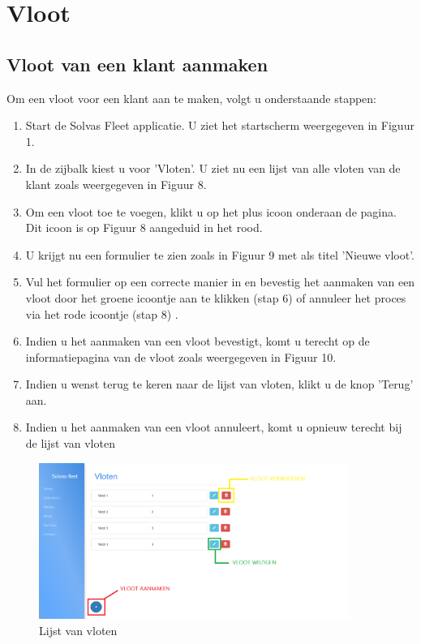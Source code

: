 \documentclass[11pt,openany]{article}
\begin{document}
\section{Vloot}
\subsection{Vloot van een klant aanmaken}
Om een vloot voor een klant aan te maken, volgt u onderstaande stappen:
\begin{enumerate}
	\item Start de Solvas Fleet applicatie. U ziet het startscherm weergegeven in Figuur 1.
	\item In de zijbalk kiest u voor 'Vloten'. U ziet nu een lijst van alle vloten van de klant zoals weergegeven in Figuur 8.
	\item Om een vloot toe te voegen, klikt u op het plus icoon onderaan de pagina. Dit icoon is op Figuur 8 aangeduid in het rood.
	\item U krijgt nu een formulier te zien zoals in Figuur 9 met als titel 'Nieuwe vloot'.
	\item Vul het formulier op een correcte manier in en bevestig het aanmaken van een vloot door het groene icoontje aan te klikken (stap 6) of annuleer het proces via het rode icoontje (stap 8) .
	\item Indien u het aanmaken van een vloot bevestigt, komt u terecht op de informatiepagina van de vloot zoals weergegeven in Figuur 10. 
	\item Indien u wenst terug te keren  naar de lijst van vloten, klikt u de knop 'Terug' aan.
	\item Indien u het aanmaken van een vloot annuleert, komt u opnieuw terecht bij de lijst van vloten 
\end{enumerate}

\begin{figure}
	\centering
	\includegraphics[width=0.9\textwidth]{fig8_2.png}
	\caption{Lijst van vloten}
\end{figure}
\end{document}
